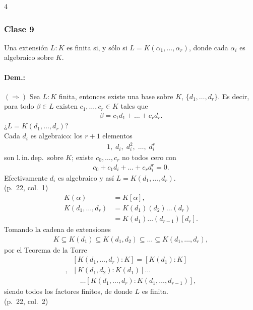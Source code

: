 \documentclass[landscape,a4paper]{article}
\begin{document}
\begin{multicols}{4}
\subsubsection*{Clase 9}
\begin{tcolorbox}[colback=white,colframe=red!80!black,colbacktitle=red!80!black,coltitle=white,title={Proposición (p.~22, col.~1)}]
Una extensión $L:K$ es finita si, y sólo si $L = K(\alpha_1,\dots,\alpha_r)$, donde cada $\alpha_i$ es algebraico sobre $K$.
\end{tcolorbox}

\paragraph{Dem.:} $(\Rightarrow)$ Sea $L:K$ finita, entonces existe una base sobre $K$, $\{d_1,\dots,d_r\}$. Es decir,\\para todo $\beta\in L$ existen $c_1,\dots,c_r\in K$ tales que
\begin{align*}
  \beta = c_1 d_1 + \dots + c_r d_r.
\end{align*}
¿$L = K(d_1,\dots,d_r)$?\\ Cada $d_i$ es algebraico: los $r+1$ elementos
\begin{align*}
 1,\;d_i,\;d_i^{2},\;\dots,\;d_i^{r}
\end{align*}
son l.\,in.\,dep.~sobre $K$; existe $c_0,\dots,c_r$ no todos cero con
\begin{align*}
  c_0 + c_1 d_i + \dots + c_r d_i^{r} = 0.
\end{align*}
Efectivamente $d_i$ es algebraico y así $L = K(d_1,\dots,d_r)$.\\ (p.~22, col.~1)
\begin{align*}
  K(\alpha) &= K[\alpha],\\
  K(d_1,\dots,d_r) &= K(d_1)(d_2)\dots(d_r) \\ &= K(d_1)\dots(d_{r-1})[d_r].
\end{align*}
Tomando la cadena de extensiones
\begin{align*}
  K \subseteq K(d_1) \subseteq K(d_1,d_2) \subseteq \dots \subseteq K(d_1,\dots,d_r),
\end{align*}
por el Teorema de la Torre
\begin{align*}
  &[K(d_1,\dots,d_r):K] = [K(d_1):K]\\,&[K(d_1,d_2):K(d_1)]\dots\\
  &\quad\dots [K(d_1,\dots,d_r):K(d_1,\dots,d_{r-1})],
\end{align*}
siendo todos los factores finitos, de donde $L$ es finita.\\ (p.~22, col.~2)

\end{multicols}
\end{document}
